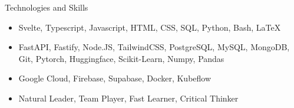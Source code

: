 \documentclass[]{mcdowellcv}
\begin{document}
	\begin{cvsection}{Technologies and Skills}
		\begin{cvsubsection}{}{}{}	
			\begin{itemize}
				\item Svelte, Typescript, Javascript, HTML, CSS, SQL, Python, Bash, \LaTeX
				\item FastAPI, Fastify, Node.JS, TailwindCSS, PostgreSQL, MySQL, MongoDB, Git, Pytorch, Huggingface, Scikit-Learn, Numpy, Pandas
				\item Google Cloud, Firebase, Supabase, Docker, Kubeflow
				\item Natural Leader, Team Player, Fast Learner, Critical Thinker
			\end{itemize}
		\end{cvsubsection}
	\end{cvsection}
	
\end{document}
